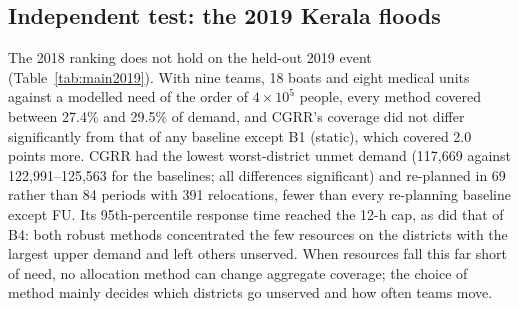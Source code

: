 \documentclass[pdflatex,sn-basic]{sn-jnl}
\theoremstyle{plain}%
\theoremstyle{remark}%
\theoremstyle{definition}%
\begin{document}
\subsection{Independent test: the 2019 Kerala floods}

The 2018 ranking does not hold on the held-out 2019 event (Table~\ref{tab:main2019}). With nine teams, 18 boats and eight medical units against a modelled need of the order of $4 \times 10^5$ people, every method covered between 27.4\% and 29.5\% of demand, and CGRR's coverage did not differ significantly from that of any baseline except B1 (static), which covered 2.0 points more. CGRR had the lowest worst-district unmet demand (117,669 against 122,991--125,563 for the baselines; all differences significant) and re-planned in 69 rather than 84 periods with 391 relocations, fewer than every re-planning baseline except FU. Its 95th-percentile response time reached the 12-h cap, as did that of B4: both robust methods concentrated the few resources on the districts with the largest upper demand and left others unserved. When resources fall this far short of need, no allocation method can change aggregate coverage; the choice of method mainly decides which districts go unserved and how often teams move.
\end{document}

